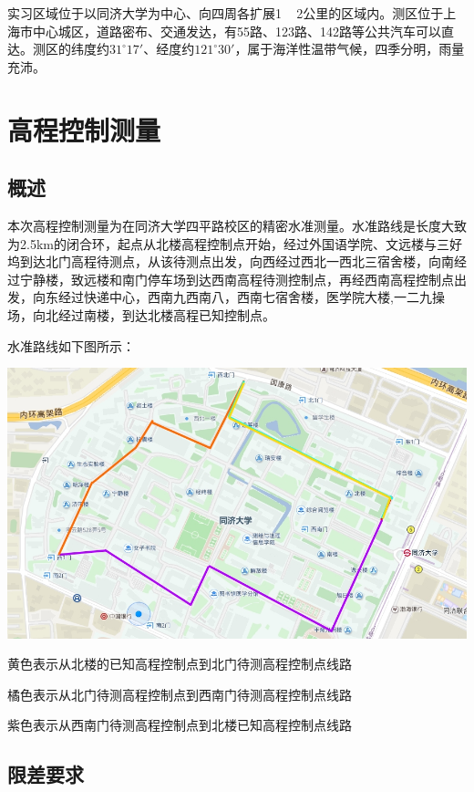 \documentclass[a4paper,16pt,UTF8]{article}
\begin{document}
实习区域位于以同济大学为中心、向四周各扩展1 ~ 2公里的区域内。测区位于上海市中心城区，道路密布、交通发达，有55路、123路、142路等公共汽车可以直达。测区的纬度约$31^{\circ}17'$、经度约$121^{\circ}30'$，属于海洋性温带气候，四季分明，雨量充沛。




\section{\LARGE 高程控制测量}

\subsection{\Large 概述}

本次高程控制测量为在同济大学四平路校区的精密水准测量。水准路线是长度大致为2.5km的闭合环，起点从北楼高程控制点开始，经过外国语学院、文远楼与三好坞到达北门高程待测点，从该待测点出发，向西经过西北一西北三宿舍楼，向南经过宁静楼，致远楼和南门停车场到达西南高程待测控制点，再经西南高程控制点出发，向东经过快递中心，西南九西南八，西南七宿舍楼，医学院大楼,一二九操场，向北经过南楼，到达北楼高程已知控制点。

水准路线如下图所示：

\begin{center}
    \includegraphics[scale = 0.45]{uvvp.jpg}

    黄色表示从北楼的已知高程控制点到北门待测高程控制点线路

    橘色表示从北门待测高程控制点到西南门待测高程控制点线路

    紫色表示从西南门待测高程控制点到北楼已知高程控制点线路
\end{center}


\subsection{\Large 限差要求}
\end{document}
